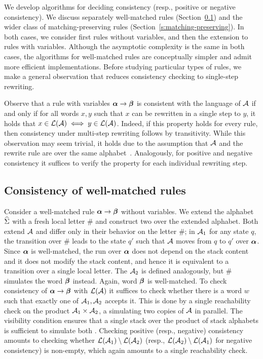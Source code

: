 \newcommand{\BalReach}{\mathcal{B}_{(4)}}
\newcommand{\autPlus}{\aut_{\sigma}}
We develop algorithms for deciding consistency (resp., positive or negative consistency). 
We discuss separately well-matched rules (Section~\ref{s:well-matched}) and the wider class of matching-preserving rules (Section~\ref{s:matching-preserving}).
In both cases, we consider first rules without variables, and then the extension to rules with variables.
Although the asymptotic complexity is the same in both cases, the algorithms for well-matched rules are conceptually simpler and admit more efficient implementations.
Before studying particular types of rules, we make a general observation that reduces consistency checking to single-step rewriting.

 Observe that a rule with variables $\boldsymbol{\alpha} \to \boldsymbol{\beta}$ is consistent with the language of $\mathcal{A}$ 
 if and only if for all words $x,y$ such that $x$ can be rewritten in a single step to $y$,  it holds that
  $x \in \mathcal{L}(\mathcal{A}) \iff y \in \mathcal{L}(\mathcal{A})$.
 Indeed, if this property holds for every rule, then  consistency under multi-step rewriting follows by transitivity.
While this observation may seem trivial, it holds due to the assumption that $\mathcal{A}$ and the rewrite rule are over the same alphabet~\cite{ecai25}.
Analogously, for positive and negative consistency it suffices to verify the property for each individual rewriting step.

\subsection{Consistency of well-matched rules}
\label{s:well-matched}

Consider a well-matched rule $\boldsymbol{\alpha} \to \boldsymbol{\beta}$ without variables. 
We extend the alphabet $\widehat{\Sigma}$ with a fresh local letter $\#$ and construct two \DVPA over the extended alphabet.
Both \DVPA extend $\mathcal{A}$ and differ only in their behavior on the letter $\#$; in $\mathcal{A}_1$ for any state $q$, 
the transition over $\#$ leads to the state $q'$ such that
$\mathcal{A}$ moves from $q$ to $q'$ over $\boldsymbol{\alpha}$. 
Since $\boldsymbol{\alpha}$ is well-matched, the run over $\boldsymbol{\alpha}$ does not depend on the stack content and it does not modify the stack content, and hence
it is equivalent to a transition over a single local letter. 
The \DVPA $\mathcal{A}_2$ is defined analogously, but $\#$ simulates the word $\boldsymbol{\beta}$ instead. Again, word $\boldsymbol{\beta}$ is well-matched. 
To check consistency of  $\boldsymbol{\alpha} \to \boldsymbol{\beta}$  with $\mathcal{L}(\mathcal{A})$ it suffices to check whether there is a word $w$ such that exactly one of \DVPA $\mathcal{A}_1, \mathcal{A}_2$ accepts it.
This is done by a single reachability check on the product \DVPA $\mathcal{A}_1 \times \mathcal{A}_2$, a \DVPA simulating two copies of $\mathcal{A}$ in parallel.
The visibility condition ensures that a single stack over the product of stack alphabets is sufficient to simulate both \DVPA.
Checking positive (resp., negative) consistency amounts to checking whether $\mathcal{L}(\mathcal{A}_1) \setminus \mathcal{L}(\mathcal{A}_2)$  (resp., $\mathcal{L}(\mathcal{A}_2) \setminus \mathcal{L}(\mathcal{A}_1)$ for negative consistency) is non-empty, 
which again amounts to a single reachability check. 



